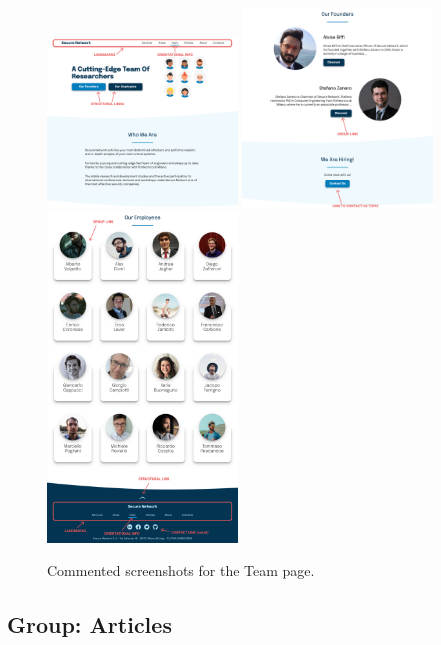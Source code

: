 \documentclass[12pt]{report}
\begin{document}
\begin{figure}[H]
	\centering
	\includegraphics[width=0.45\textwidth]{high_fid_wireframes/team/1.png}
	\includegraphics[width=0.45\textwidth]{high_fid_wireframes/team/2.png}
	\includegraphics[width=0.45\textwidth]{high_fid_wireframes/team/3.png}
	\caption{Commented screenshots for the Team page.}
\end{figure}

\subsection{Group: Articles}
\end{document}
